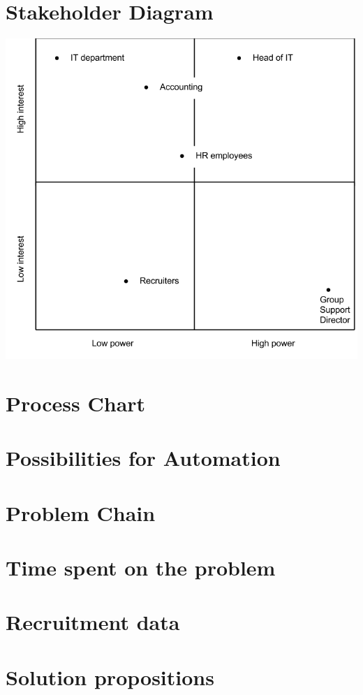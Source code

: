 \chapter{Stakeholder Diagram}
\label{app:stakeholder_diagram}
\includegraphics[width=\textwidth]{appendix/stakeholder_diagram.png}
\chapter{Process Chart}

\chapter{Possibilities for Automation}

\chapter{Problem Chain}

\chapter{Time spent on the problem}

\chapter{Recruitment data}

\chapter{Solution propositions}

